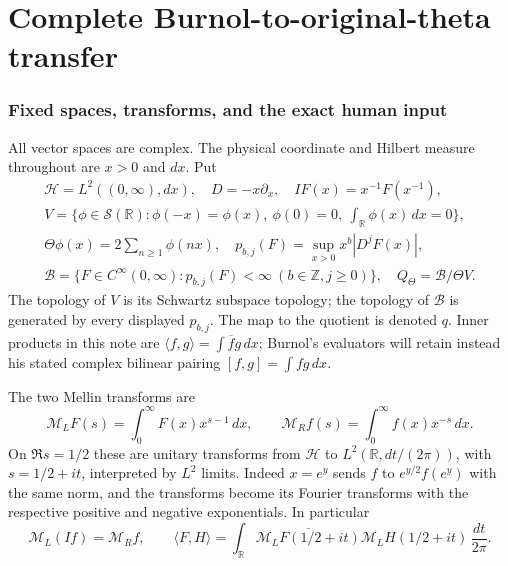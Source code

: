 \documentclass[11pt]{article}
\begin{document}
\endgroup

\clearpage\begingroup
\part*{Complete Burnol-to-original-theta transfer}
\newtheorem{mburntheorem}{Theorem}[section]
\newtheorem{mburnproposition}[mburntheorem]{Proposition}
\newtheorem{mburnlemma}[mburntheorem]{Lemma}
\newtheorem{mburncorollary}[mburntheorem]{Corollary}
\newcommand{\mburnC}{\mathbb C}\newcommand{\mburnR}{\mathbb R}
\newcommand{\mburnB}{\mathscr B}\newcommand{\mburnHH}{\mathcal H}
\newcommand{\mburnML}{\mathcal M_{\!L}}\newcommand{\mburnMR}{\mathcal M_{\!R}}
\newcommand{\mburnPP}{\mathcal P}\newcommand{\mburnFc}{\mathcal F_+}
\newcommand{\mburnnorm}[1]{\left\lVert#1\right\rVert}


\section{Fixed spaces, transforms, and the exact human input}

All vector spaces are complex. The physical coordinate and Hilbert
measure throughout are $x>0$ and $dx$. Put
\begin{equation}\label{mburn:eq:objects}
\begin{gathered}
 \mburnHH=L^2((0,\infty),dx),\quad D=-x\partial_x,\quad
 IF(x)=x^{-1}F(x^{-1}),\\
 V=\{\phi\in\mathcal S(\mburnR):\phi(-x)=\phi(x),\ 
       \phi(0)=0,\ \int_\mburnR\phi(x)\,dx=0\},\\
 \Theta\phi(x)=2\sum_{n\geq1}\phi(nx),\quad
 p_{b,j}(F)=\sup_{x>0}x^b|D^jF(x)|,\\
 \mburnB=\{F\in C^\infty(0,\infty):p_{b,j}(F)<\infty
                          \ (b\in\mathbb Z,j\geq0)\},
 \quad Q_\Theta=\mburnB/\Theta V.
\end{gathered}
\end{equation}
The topology of $V$ is its Schwartz subspace topology; the topology
of $\mburnB$ is generated by every displayed $p_{b,j}$. The map to the
quotient is denoted $q$. Inner products in this note are
$\langle f,g\rangle=\int\overline f g\,dx$; Burnol's evaluators will
retain instead his stated complex bilinear pairing
$[f,g]=\int fg\,dx$.

The two Mellin transforms are
\begin{equation}\label{mburn:eq:mellin}
 \mburnML F(s)=\int_0^\infty F(x)x^{s-1}\,dx,\qquad
 \mburnMR f(s)=\int_0^\infty f(x)x^{-s}\,dx.
\end{equation}
On $\Re s=1/2$ these are unitary transforms from $\mburnHH$ to
$L^2(\mburnR,dt/(2\pi))$, with $s=1/2+it$, interpreted by $L^2$
limits. Indeed $x=e^y$ sends $f$ to $e^{y/2}f(e^y)$ with the same
norm, and the transforms become its Fourier transforms with the
respective positive and negative exponentials. In particular
\begin{equation}\label{mburn:eq:parseval}
 \mburnML(If)=\mburnMR f,\qquad
 \langle F,H\rangle=\int_\mburnR
       \overline{\mburnML F(1/2+it)}\mburnML H(1/2+it)\,\frac{dt}{2\pi}.
\end{equation}
\end{document}
